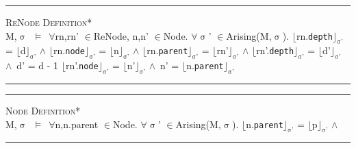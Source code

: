 \documentclass[a4paper,11pt, twoside,twocolumn]{article}
\newenvironment{logic}[1][]
{\begin{flushleft} \small }
{\end{flushleft}}
\newcommand{\loin}{$\in$}
\newcommand{\loforall}{$\forall$}
\newcommand{\loand}{$\land$}
\newcommand{\losigma}{$\upsigma$}
\newcommand{\loturns} {$\vDash$}
\newcommand{\loexec}[2] {$\lfloor$#1$\rfloor _{\text{#2}}$}
\newcommand{\ablock} {\null\qquad}
\begin{document}
\begin{logic} 
\hrule\null
\textsc{\normalsize *ReNode Definition*}\\
M,\losigma\ \loturns\ \loforall rn,rn' \loin ReNode, n,n' \loin Node.\linebreak
\ablock \loforall \losigma' \loin Arising(M,\losigma).\linebreak
\ablock \loexec{rn.\texttt{depth}}{\losigma'} = \loexec{d}{\losigma'} \loand \linebreak
\ablock \loexec{rn.\texttt{node}}{\losigma'} = \loexec{n}{\losigma'} \loand \linebreak
\ablock \loexec{rn.\texttt{parent}}{\losigma'} = \loexec{rn'}{\losigma'} \loand\linebreak
\ablock \loexec{rn'.\texttt{depth}}{\losigma'} = \loexec{d'}{\losigma'} \loand\ d' = d - 1\linebreak
\ablock \loexec{rn'.\texttt{node}}{\losigma'} = \loexec{n'}{\losigma'} \loand\ n' = \loexec{n.\texttt{parent}}{\losigma'}\linebreak
\hrule
\end{logic}
\begin{logic} 
\hrule\null
\textsc{\normalsize *Node Definition*}\\
M,\losigma\ \loturns\ \loforall n,n.parent \loin Node.\linebreak
\ablock \loforall \losigma' \loin Arising(M,\losigma).\linebreak
\ablock \loexec{n.\texttt{parent}}{\losigma'} = \loexec{p}{\losigma'} \loand \linebreak
\hrule
\end{logic}

\small



\end{document}

